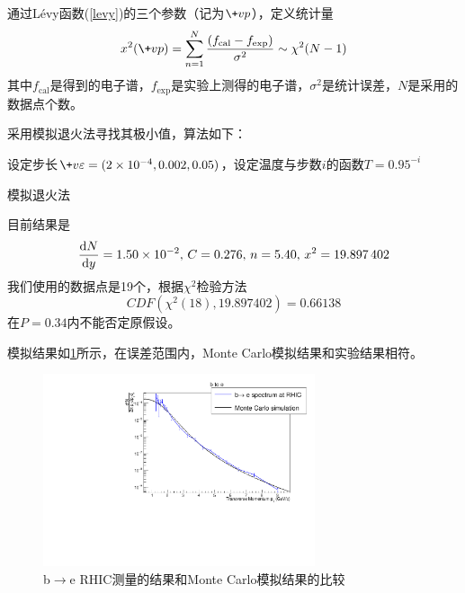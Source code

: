 \documentclass[12pt, a4paper]{ctexart}
\begin{document}
通过L\'evy函数(\cref{levy})的三个参数（记为$\+vp$），定义统计量
\begin{equation}
x^2(\+vp)=\sum_{n=1}^N\frac{(f_\text{cal}-f_\text{exp})}{\sigma^2}\sim\chi^2(N-1) 
\end{equation}
其中$f_\text{cal}$是得到的电子谱，$f_\text{exp}$是实验上测得的电子谱，$\sigma^2$是统计误差，$N$是采用的数据点个数。\par
采用模拟退火法寻找其极小值，算法如下：\par
\begin{algorithm}[htb]
  \small

  设定步长$\+v\varepsilon=(\num{2e-4}, \num{0.002}, \num{0.05})$，设定温度与步数$i$的函数$T=0.95^{-i}$\;
  \While{步数$<$设定最大步数}{
    计算$x^2(\+vp)$\;
   	产生一个随机向量$\+v\xi\sim U[-1,1]^3$。计算$x^2(\+vp+\+v\xi\times\varepsilon)$，这里乘法是逐项相乘 \;
   	产生随机数$\xi\sim U[0,1)$\;
    \If{$\xi<\min\pare{1,\exp(-(x^2-x'^2)/T)}$}{
      $\+vp=\+vp+\+v\xi$\;
  }
  }
  \caption{模拟退火法}
  \label{algo:algorithm1}
\end{algorithm}
目前结果是
\begin{equation}\label{params}
	\frac{\mathrm{d} N}{\mathrm{d} y} = \num{1.50e-02},\,C = \num{0.276},\,n = \num{5.40},\, x^2=\num{19.897402}
\end{equation}
我们使用的数据点是19个，根据$\chi^2$检验方法
\begin{equation}
	CDF(\chi^2(18),\num{19.897402})=\num{0.66138}
\end{equation}
在$P=\num{0.34}$内不能否定原假设。\par
模拟结果如\cref{b2e}所示，在误差范围内，Monte Carlo模拟结果和实验结果相符。
\begin{figure}[h]\centering
	\includegraphics[width=8cm]{figures/unnamed.pdf}
	\caption{b$\to$e RHIC测量的结果和Monte Carlo模拟结果的比较}
	\label{b2e}
\end{figure}
\end{document}
